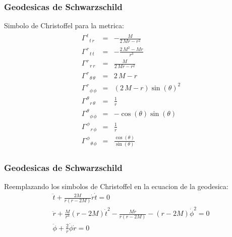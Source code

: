 \documentclass{beamer}
\begin{document}


\begin{frame}
\frametitle{Geodesicas de Schwarzschild}
Simbolo de Christoffel para la metrica: 
\begin{gather*}
\begin{array}{lcl} \Gamma_{ \phantom{\, t} \, t \, r }^{ \, t \phantom{\, t} \phantom{\, r} } & = & -\frac{M}{2 \, M r - r^{2}} \\ \Gamma_{ \phantom{\, r} \, t \, t }^{ \, r \phantom{\, t} \phantom{\, t} } & = & -\frac{2 \, M^{2} - M r}{r^{3}} \\ \Gamma_{ \phantom{\, r} \, r \, r }^{ \, r \phantom{\, r} \phantom{\, r} } & = & \frac{M}{2 \, M r - r^{2}} \\ \Gamma_{ \phantom{\, r} \, {\theta} \, {\theta} }^{ \, r \phantom{\, {\theta}} \phantom{\, {\theta}} } & = & 2 \, M - r \\ \Gamma_{ \phantom{\, r} \, {\phi} \, {\phi} }^{ \, r \phantom{\, {\phi}} \phantom{\, {\phi}} } & = & {\left(2 \, M - r\right)} \sin\left({\theta}\right)^{2} \\ \Gamma_{ \phantom{\, {\theta}} \, r \, {\theta} }^{ \, {\theta} \phantom{\, r} \phantom{\, {\theta}} } & = & \frac{1}{r} \\ \Gamma_{ \phantom{\, {\theta}} \, {\phi} \, {\phi} }^{ \, {\theta} \phantom{\, {\phi}} \phantom{\, {\phi}} } & = & -\cos\left({\theta}\right) \sin\left({\theta}\right) \\ \Gamma_{ \phantom{\, {\phi}} \, r \, {\phi} }^{ \, {\phi} \phantom{\, r} \phantom{\, {\phi}} } & = & \frac{1}{r} \\ \Gamma_{ \phantom{\, {\phi}} \, {\theta} \, {\phi} }^{ \, {\phi} \phantom{\, {\theta}} \phantom{\, {\phi}} } & = & \frac{\cos\left({\theta}\right)}{\sin\left({\theta}\right)} \end{array}
\end{gather*}
\end{frame}



\begin{frame}
\frametitle{Geodesicas de Schwarzschild}

Reemplazando los simbolos de Christoffel en la ecuacion de la geodesica: 
\begin{gather*}
  \ddot t + \frac{2M}{r(r-2M)}\dot r \dot t = 0\\
  \ddot r + \frac{M}{r^3}(r-2M)\dot t^2 - \frac{M\dot r}{r(r-2M)}-(r-2M)\dot \phi^2=0 \\
  \ddot \phi + \frac{2}{r} \dot \phi \dot r = 0 
\end{gather*}
\end{frame}
\end{document}
